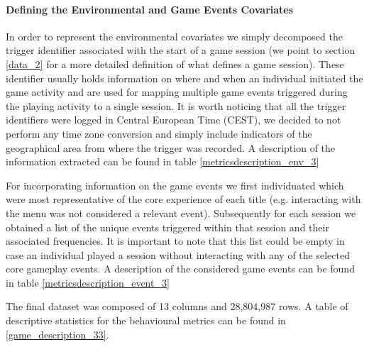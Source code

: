 \paragraph*{Defining the Environmental and Game Events Covariates}
In order to represent the environmental covariates we simply decomposed the trigger identifier associated with the start of a game session (we point to section \ref{data_2} for a more detailed definition of what defines a game session). These identifier usually holds information on where and when an individual initiated the game activity and are used for mapping multiple game events triggered during the playing activity to a single session. It is worth noticing that all the trigger identifiers were logged in Central European Time (CEST), we decided to not perform any time zone conversion and simply include indicators of the geographical area from where the trigger was recorded. A description of the information extracted can be found in table \ref{metricsdescription_env_3}

For incorporating information on the game events we first individuated which were most representative of the core experience of each title (e.g. interacting with the menu was not considered a relevant event). Subsequently for each session we obtained a list of the unique events triggered within that session and their associated frequencies. It is important to note that this list could be empty in case an individual played a session without interacting with any of the selected core gameplay events. A description of the considered game events can be found in table \ref{metricsdescription_event_3}

The final dataset was composed of 13 columns and 28,804,987 rows. A table of descriptive statistics for the behavioural metrics can be found in \ref{game_description_33}.

